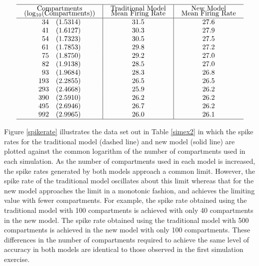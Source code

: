 \begin{table}[!h]
\[
\begin{array}{c|c|c}
\hline
\mbox{\begin{tabular}{c}
Compartments \\[-5pt] (log$_{10}(\mbox{Compartments}))$
\end{tabular}} &
\mbox{\begin{tabular}{c}
Traditional Model \\[-5pt] Mean Firing Rate
\end{tabular}}
&\mbox{\begin{tabular}{c}
New Model \\[-5pt] Mean Firing Rate \end{tabular}}\\
\hline
\phantom{0}34 \quad (1.5314) & 31.5 & 27.6 \\
\phantom{0}41 \quad (1.6127) & 30.3 & 27.9 \\
\phantom{0}54 \quad (1.7323) & 30.5 & 27.5 \\
\phantom{0}61 \quad (1.7853) & 29.8 & 27.2 \\
\phantom{0}75 \quad (1.8750) & 29.2 & 27.0 \\
\phantom{0}82 \quad (1.9138) & 28.5 & 27.0 \\
\phantom{0}93 \quad (1.9684) & 28.3 & 26.8 \\
          193 \quad (2.2855) & 26.5 & 26.5 \\
          293 \quad (2.4668) & 25.9 & 26.2 \\
          390 \quad (2.5910) & 26.2 & 26.2 \\
          495 \quad (2.6946) & 26.7 & 26.2 \\
          992 \quad (2.9965) & 26.0 & 26.1 \\
\hline
\end{array}
\]
\centering
\parbox{5in}{\caption{\label{simex2} The results of the second
simulation exercise for a traditional compartmental model and the
new compartmental model in which 10 second records of spike train
activity are obtained for both models for 12 different levels of
spatial discretisation (number of compartments).}}
\end{table}

Figure \ref{spikerate} illustrates the data set out in Table
\ref{simex2} in which the spike rates for the traditional model
(dashed line) and new model (solid line) are plotted against the
common logarithm of the number of compartments used in each
simulation. As the number of compartments used in each model is
increased, the spike rates generated by both models approach a
common limit. However, the spike rate of the traditional model
oscillates about this limit whereas that for the new model
approaches the limit in a monotonic fashion, and achieves the
limiting value with fewer compartments. For example, the spike
rate obtained using the traditional model with 100 compartments is
achieved with only 40 compartments in the new model. The spike
rate obtained using the traditional model with 500 compartments is
achieved in the new model with only 100 compartments. These
differences in the number of compartments required to achieve the
same level of accuracy in both models are identical to those
observed in the first simulation exercise.

